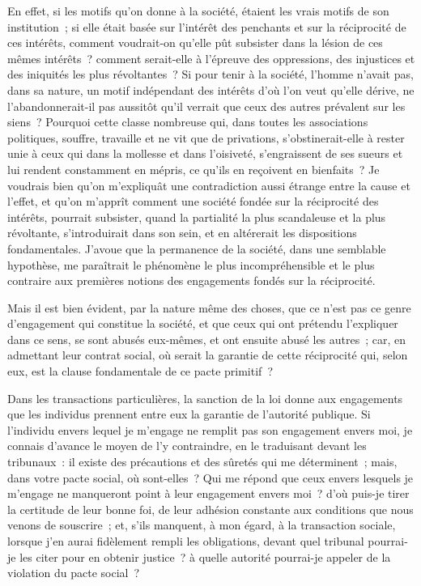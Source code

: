 \documentclass[french,twoside]{book} %
\begin{document}
En effet, si les motifs qu’on donne à la société, étaient les vrais motifs de son institution ; si elle était basée sur l’intérêt des penchants et sur la réciprocité de ces intérêts, comment voudrait-on qu’elle pût subsister dans la lésion de ces mêmes intérêts ? comment serait-elle à l’épreuve des oppressions, des injustices et des iniquités les plus révoltantes ? Si pour tenir à la société, l’homme n’avait pas, dans sa nature, un motif indépendant des intérêts d’où l’on veut qu’elle dérive, ne l’abandonnerait-il pas aussitôt qu’il verrait que ceux des autres prévalent sur les siens ? Pourquoi cette classe nombreuse qui, dans toutes les associations politiques, souffre, travaille et ne vit que de privations, s’obstinerait-elle à rester unie à ceux qui dans la mollesse et dans l’oisiveté, s’engraissent de ses sueurs et lui rendent constamment en mépris, ce qu’ils en reçoivent en bienfaits ? Je voudrais bien qu’on m’expliquât une contradiction aussi étrange entre la cause et l’effet, et qu’on m’apprît comment une société fondée sur la réciprocité des intérêts, pourrait subsister, quand la partialité la plus scandaleuse et la plus révoltante, s’introduirait dans son sein, et en altérerait les dispositions fondamentales. J’avoue que la permanence de la société, dans une semblable hypothèse, me paraîtrait le phénomène le plus incompréhensible et le plus contraire aux premières notions des engagements fondés sur la réciprocité.\par
Mais il est bien évident, par la nature même des choses, que ce n’est pas ce genre d’engagement qui constitue la société, et que ceux qui ont prétendu l’expliquer dans ce sens, se sont abusés eux-mêmes, et ont ensuite abusé les autres ; car, en admettant leur contrat social, où serait la garantie de cette réciprocité qui, selon eux, est la clause fondamentale de ce pacte primitif ?\par
Dans les transactions particulières, la sanction de la loi donne aux engagements que les individus prennent entre eux la garantie de l’autorité publique. Si l’individu envers lequel je m’engage ne remplit pas son engagement envers moi, je connais d’avance le moyen de l’y contraindre, en le traduisant devant les tribunaux : il existe des précautions et des sûretés qui me déterminent ; mais, dans votre pacte social, où sont-elles ? Qui me répond que ceux envers lesquels je m’engage ne manqueront point à leur engagement envers moi ? d’où puis-je tirer la certitude de leur bonne foi, de leur adhésion constante aux conditions que nous venons de souscrire ; et, s’ils manquent, à mon égard, à la transaction sociale, lorsque j’en aurai fidèlement rempli les obligations, devant quel tribunal pourrai-je les citer pour en obtenir justice ? à quelle autorité pourrai-je appeler de la violation du pacte social ?\par
\end{document}
